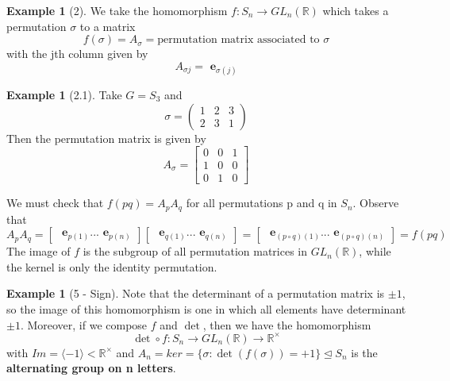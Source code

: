 \documentclass[12pt]{article}
\theoremstyle{definition}
\newtheorem{eg}[thm]{Example}
\theoremstyle{remark}
\numberwithin{equation}{section}
\newcommand\R{\mathbb R}    %
\newcommand\B[1]{\textbf{ #1}}
\newcommand\nsub{\trianglelefteq}
\begin{document}
\begin{eg}[2]
        We take the homomorphism $f: S_n \rightarrow GL_n(\R)$ which takes a permutation $\sigma$ to a matrix \begin{equation}
                f(\sigma) = A_{\sigma} = \text{permutation matrix associated to } \sigma 
        \end{equation}
        with the jth column given by \begin{equation}
                A_{\sigma j} = \B{e}_{\sigma(j)}
        \end{equation}
        \begin{eg}[2.1]
                Take $G = S_3$ and \begin{equation*}
                        \sigma = \begin{pmatrix} 1 & 2 & 3 \\ 2 & 3 & 1\end{pmatrix}
                \end{equation*}
                Then the permutation matrix is given by \begin{equation*}
                        A_{\sigma} = \begin{bmatrix} 0 & 0 & 1 \\ 1 & 0 & 0 \\ 0 & 1 & 0 \end{bmatrix}
                \end{equation*}
        \end{eg}
        We must check that $f(pq) = A_pA_q$ for all permutations p and q in $S_n$. Observe that \begin{equation*}
                A_pA_q = \begin{bmatrix} \B{e}_{p(1)} ... \B{e}_{p(n)} \end{bmatrix} \begin{bmatrix} \B{e}_{q(1)} ... \B{e}_{q(n)} \end{bmatrix} = \begin{bmatrix} \B{e}_{(p\circ q)(1)} ... \B{e}_{(p\circ q)(n)} \end{bmatrix} = f(pq)
        \end{equation*}
        The image of $f$ is the subgroup of all permutation matrices in $GL_n(\R)$, while the kernel is only the identity permutation.
\end{eg}

\begin{eg}[5 - Sign]
        Note that the determinant of a permutation matrix is $\pm 1$, so the image of this homomorphism is one in which all elements have determinant $\pm 1$. Moreover, if we compose $f$ and $\det$, then we have the homomorphism \begin{equation}
                \det \circ f: S_n \rightarrow GL_n(\R) \rightarrow \R^{\times}
        \end{equation}
        with $Im = \langle -1 \rangle < \R^{\times}$ and $A_n = ker = \{\sigma:\det(f(\sigma)) = +1\} \nsub S_n$ is the \B{alternating group on n letters}.
\end{eg}
\end{document}
